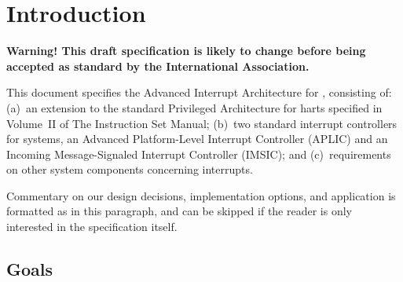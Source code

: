 
\chapter{Introduction}
\label{ch:intro}

\textbf{%
Warning!
This draft specification is likely to change before being accepted as
standard by the {\RISCV} International Association.%
}
\bigskip

This document specifies the Advanced Interrupt Architecture for
{\RISCV}, consisting of:
(a)~an extension to the standard Privileged Architecture for {\RISCV}
harts specified in Volume~II of The {\RISCV} Instruction Set Manual;
(b)~two standard interrupt controllers for {\RISCV} systems, an
Advanced Platform-Level Interrupt Controller (APLIC) and an
Incoming Message-Signaled Interrupt Controller (IMSIC); and
(c)~requirements on other system components concerning interrupts.

\begin{commentary}
Commentary on our design decisions, implementation options, and
application is formatted as in this paragraph, and can be skipped if
the reader is only interested in the specification itself.
\end{commentary}

\section{Goals}

